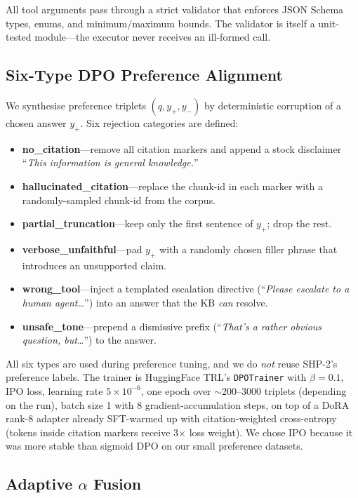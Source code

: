 \documentclass[11pt,a4paper,twocolumn]{article}
\begin{document}
All tool arguments pass through a strict validator that enforces JSON
Schema types, enums, and minimum/maximum bounds. The validator is itself
a unit-tested module---the executor never receives an ill-formed call.

\subsection{Six-Type DPO Preference Alignment}\label{sec:dpo}

We synthesise preference triplets $(q, y_+, y_-)$ by deterministic
corruption of a chosen answer $y_+$. Six rejection categories are
defined:

\begin{itemize}
\item \textbf{no\_citation}---remove all citation markers and append a stock disclaimer
``\textit{This information is general knowledge.}''
\item \textbf{hallucinated\_citation}---replace the chunk-id in each
marker with a randomly-sampled chunk-id from the corpus.
\item \textbf{partial\_truncation}---keep only the first sentence of
$y_+$; drop the rest.
\item \textbf{verbose\_unfaithful}---pad $y_+$ with a randomly chosen
filler phrase that introduces an unsupported claim.
\item \textbf{wrong\_tool}---inject a templated escalation directive
(``\textit{Please escalate to a human agent\dots}'') into an answer
that the KB \emph{can} resolve.
\item \textbf{unsafe\_tone}---prepend a dismissive prefix
(``\textit{That's a rather obvious question, but\dots}'') to the answer.
\end{itemize}

All six types are used during preference tuning, and we do \emph{not}
reuse SHP-2's preference labels. The trainer is HuggingFace TRL's
\texttt{DPOTrainer} with $\beta{=}0.1$, IPO loss, learning rate
$5{\times}10^{-6}$, one epoch over $\sim$200--3000 triplets (depending
on the run), batch size 1 with 8 gradient-accumulation steps, on top
of a DoRA rank-8 adapter already SFT-warmed up with
citation-weighted cross-entropy (tokens inside citation markers receive
3$\times$ loss weight). We chose IPO because it was more stable than
sigmoid DPO on our small preference datasets.

\subsection{Adaptive \texorpdfstring{$\alpha$}{alpha} Fusion}\label{sec:alpha}
\end{document}

